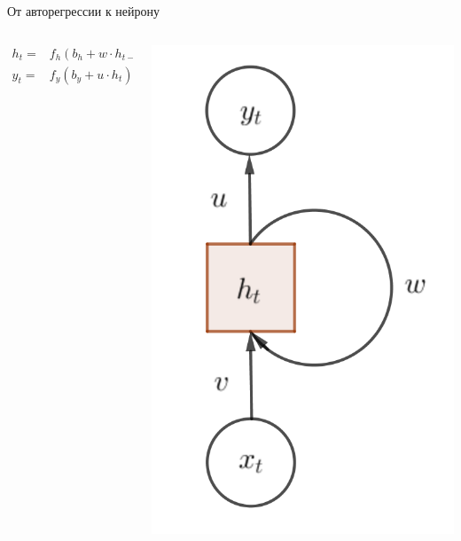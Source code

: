 \documentclass[notes,12pt, aspectratio=169]{beamer}
\begin{document}
\begin{frame}{От авторегрессии к нейрону}
\begin{columns}
	\begin{column}{.68\linewidth}
		\begin{equation*} 
		\begin{aligned}
		h_t =& f_h(b_h + w \cdot h_{t-1} + v \cdot x_t)\\
		y_t =& f_y(b_y + u \cdot h_t)
		\end{aligned}
		\end{equation*} 
	\end{column}
	\begin{column}{.28\linewidth}
		\begin{center}
			\includegraphics[width=.9\linewidth]{rec_neuron_3.png}
		\end{center}
	\end{column}	
\end{columns}
\end{frame}
\end{document}
